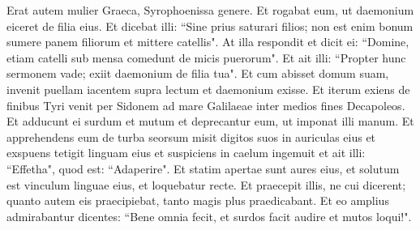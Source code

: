 \begin{biblechapter}
\verse Erat autem mulier Graeca, Syrophoenissa genere. Et rogabat eum, ut daemonium eiceret de filia eius. 
\verse Et dicebat illi: “Sine prius saturari filios; non est enim bonum sumere panem filiorum et mittere catellis". 
\verse At illa respondit et dicit ei: “Domine, etiam catelli sub mensa comedunt de micis puerorum". 
\verse Et ait illi: “Propter hunc sermonem vade; exiit daemonium de filia tua". 
\verse Et cum abisset domum suam, invenit puellam iacentem supra lectum et daemonium exisse. 
\verse Et iterum exiens de finibus Tyri venit per Sidonem ad mare Galilaeae inter medios fines Decapoleos. 
\verse Et adducunt ei surdum et mutum et deprecantur eum, ut imponat illi manum. 
\verse Et apprehendens eum de turba seorsum misit digitos suos in auriculas eius et exspuens tetigit linguam eius 
\verse et suspiciens in caelum ingemuit et ait illi: “Effetha", quod est: “Adaperire".  
\verse Et statim apertae sunt aures eius, et solutum est vinculum linguae eius, et loquebatur recte. 
\verse Et praecepit illis, ne cui dicerent; quanto autem eis praecipiebat, tanto magis plus praedicabant. 
\verse Et eo amplius admirabantur dicentes: “Bene omnia fecit, et surdos facit audire et mutos loqui!". 
\end{biblechapter}

